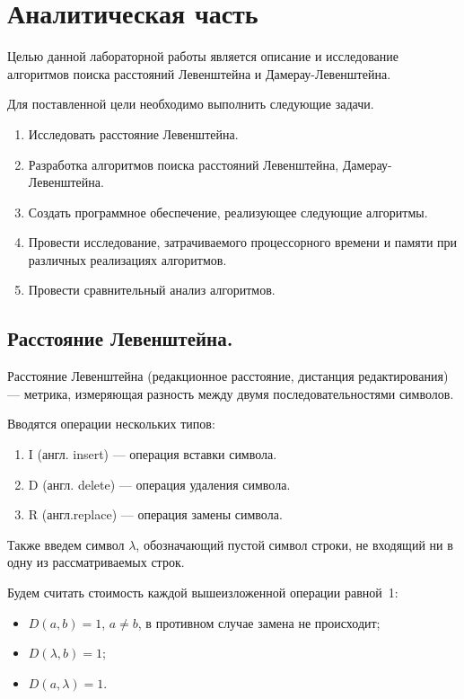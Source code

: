 \chapter{Аналитическая часть}
\label{sec:targets}
Целью данной лабораторной работы является описание и исследование алгоритмов поиска расстояний Левенштейна и Дамерау-Левенштейна.


Для поставленной цели необходимо выполнить следующие задачи.
\begin{enumerate}
	\item Исследовать расстояние Левенштейна.
	\item Разработка алгоритмов поиска расстояний Левенштейна, Дамерау-Левенштейна.
	\item Создать программное обеспечение, реализующее следующие алгоритмы.
	\item Провести исследование, затрачиваемого процессорного времени и памяти при различных реализациях алгоритмов.
	\item Провести сравнительный анализ алгоритмов.
\end{enumerate}

\section{Расстояние Левенштейна.}


Расстояние Левенштейна (редакционное расстояние, дистанция редактирования) --- метрика, измеряющая разность между двумя последовательностями символов. \cite{levenshtein}

Вводятся операции нескольких типов:
\begin{enumerate}
	\item I (англ. insert) --- операция вставки символа.
	\item D (англ. delete) --- операция удаления символа.
	\item R (англ.replace) --- операция замены символа.
\end{enumerate}
Также введем символ $\lambda$, обозначающий пустой символ строки, не входящий ни в одну из рассматриваемых строк.

Будем считать стоимость каждой вышеизложенной операции равной~1:
\begin{itemize}[label=---]
	\item $D(a, b) = 1$, $a \neq b$, в противном случае замена не происходит;
	\item $D(\lambda, b) = 1$;
	\item $D(a, \lambda) = 1$.
\end{itemize}


